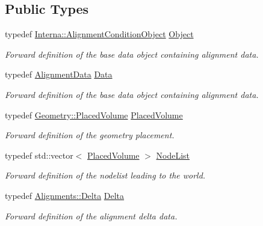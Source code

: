 \subsection*{Public Types}
\begin{DoxyCompactItemize}
\item 
typedef \hyperlink{class_d_d4hep_1_1_alignments_1_1_interna_1_1_alignment_condition_object}{Interna\+::\+Alignment\+Condition\+Object} \hyperlink{class_d_d4hep_1_1_alignments_1_1_alignment_condition_aad9d743ab04b8eb38063249c6a9e16c0}{Object}
\begin{DoxyCompactList}\small\item\em Forward definition of the base data object containing alignment data. \end{DoxyCompactList}\item 
typedef \hyperlink{class_d_d4hep_1_1_alignments_1_1_alignment_data}{Alignment\+Data} \hyperlink{class_d_d4hep_1_1_alignments_1_1_alignment_condition_a6fcd9bd0e9ac67afcf43270cbd9e9983}{Data}
\begin{DoxyCompactList}\small\item\em Forward definition of the base data object containing alignment data. \end{DoxyCompactList}\item 
typedef \hyperlink{class_d_d4hep_1_1_geometry_1_1_placed_volume}{Geometry\+::\+Placed\+Volume} \hyperlink{class_d_d4hep_1_1_alignments_1_1_alignment_condition_a4d73434f31bcdf1c29d271c14b9122cb}{Placed\+Volume}
\begin{DoxyCompactList}\small\item\em Forward definition of the geometry placement. \end{DoxyCompactList}\item 
typedef std\+::vector$<$ \hyperlink{class_d_d4hep_1_1_alignments_1_1_alignment_condition_a4d73434f31bcdf1c29d271c14b9122cb}{Placed\+Volume} $>$ \hyperlink{class_d_d4hep_1_1_alignments_1_1_alignment_condition_ae1ff696352ce5e8726973ea89cf80d8a}{Node\+List}
\begin{DoxyCompactList}\small\item\em Forward definition of the nodelist leading to the world. \end{DoxyCompactList}\item 
typedef \hyperlink{class_d_d4hep_1_1_alignments_1_1_delta}{Alignments\+::\+Delta} \hyperlink{class_d_d4hep_1_1_alignments_1_1_alignment_condition_a7a0f38a79212c07c444c8c8cd512bbd6}{Delta}
\begin{DoxyCompactList}\small\item\em Forward definition of the alignment delta data. \end{DoxyCompactList}\item 

\end{DoxyCompactItemize}
